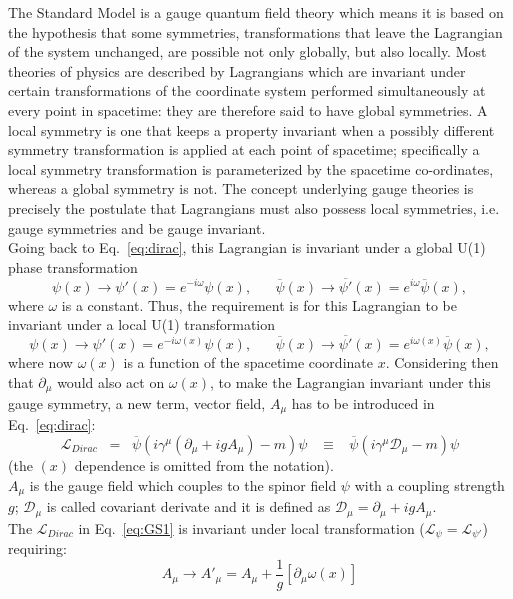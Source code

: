 The Standard Model is a gauge quantum field theory which means it is based on the hypothesis that some symmetries, \ie transformations that leave the Lagrangian of the system unchanged, are possible not only globally, but also locally.
Most theories of physics are described by Lagrangians which are invariant under certain transformations of the coordinate system performed simultaneously at every point in spacetime: they are therefore said to have global symmetries. A local symmetry is one that keeps a property invariant when a possibly different symmetry transformation is applied at each point of spacetime; specifically a local symmetry transformation is parameterized by the spacetime co-ordinates, whereas a global symmetry is not. The concept underlying gauge theories is precisely the postulate that Lagrangians must also possess local symmetries, i.e. gauge symmetries and be gauge invariant.\\
Going back to Eq.~\ref{eq:dirac}, this Lagrangian is invariant under a global U(1) phase transformation
\begin{equation}
\label{eq:globalT}
 \psi(x) \rightarrow \psi'(x) = e^{-i\omega} \psi(x), \; \; \; \; \; \;    \overline{\psi}(x) \rightarrow \overline{\psi'}(x) = e^{i\omega} \overline{\psi}(x),
\end{equation}
where $\omega$ is a constant. Thus, the requirement is for this Lagrangian to be invariant under a local U(1) transformation
\begin{equation}
\label{eq:localT}
 \psi(x) \rightarrow \psi'(x) = e^{-i\omega(x)} \psi(x), \; \; \; \; \; \;    \overline{\psi}(x) \rightarrow \overline{\psi'}(x) = e^{i\omega(x)} \overline{\psi}(x),
\end{equation}
where now $\omega(x)$ is a function of the spacetime coordinate $x$. Considering then that $\partial_{\mu}$ would also act on $\omega(x)$, to make the 
Lagrangian invariant under this gauge symmetry, a new term, vector field, $A_{\mu}$ has to be introduced in Eq.~\ref{eq:dirac}:
\begin{equation}
\label{eq:GS1}
 \mathcal{L}_{Dirac} \;\; = \;\; \overline{\psi} (i\gamma^{\mu} (\partial_{\mu} + igA_{\mu})-m) \psi \;\;\; \equiv  \;\;\; \overline{\psi} (i\gamma^{\mu}\mathcal{D}_{\mu}-m) \psi 
\end{equation}
(the $(x)$ dependence is omitted from the notation).\\
 $A_{\mu}$ is the gauge field which couples to the spinor field $\psi$ with a coupling strength $g$; $\mathcal{D}_{\mu}$ is called covariant derivate and it is defined as $\mathcal{D}_{\mu} = \partial_{\mu} + igA_{\mu}$. \\
The $\mathcal{L}_{Dirac}$ in Eq.~\ref{eq:GS1} is invariant under local transformation ($\mathcal{L}_{\psi} =\mathcal{L}_{\psi'}$) requiring:
\begin{equation}
\label{eq:GS2}
A_{\mu} \rightarrow A'_{\mu} =  A_{\mu} + \frac{1}{g}[\partial_{\mu} \omega(x)]
\end{equation}

